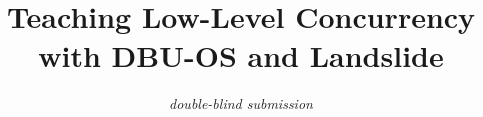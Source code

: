 \documentclass{sig-alternate-05-2015}
\begin{document}




\newcommand\carnegiemellon{{\em Double-Blind University}\xspace}
\newcommand\cmu{DBU\xspace}
\newcommand\pebbles{\cmu-OS\xspace}
\newcommand\landslide{Landslide\xspace}
\newcommand\fourten{CS999\xspace}

\title{Teaching Low-Level Concurrency with \pebbles and \landslide}


\author{
	\em double-blind submission
}
\end{document}
